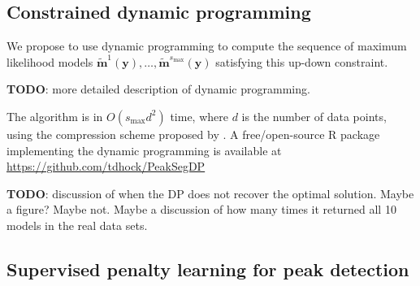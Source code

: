 \documentclass{article}
\begin{document}
\subsection{Constrained dynamic programming}
\label{sec:constrained-dp}

We propose to use dynamic programming to compute the sequence of
maximum likelihood models $\mathbf{\tilde m}^1(\mathbf y), \dots,
\mathbf{\tilde m}^{s_{\text{max}}}(\mathbf y)$ satisfying this up-down
constraint.

\textbf{TODO}: more detailed description of dynamic programming.

The algorithm is in $O(s_{\text{max}} d^2)$ time, where $d$ is the
number of data points, using the compression scheme proposed by
\citet{Segmentor}. A free/open-source R package implementing the
dynamic
programming is available at\\
\url{https://github.com/tdhock/PeakSegDP}

\textbf{TODO}: discussion of when the DP does not recover the optimal
solution. Maybe a figure? Maybe not. Maybe a discussion of how many
times it returned all 10 models in the real data sets.

\subsection{Supervised penalty learning for peak detection}
\label{sec:supervised}
\end{document}
